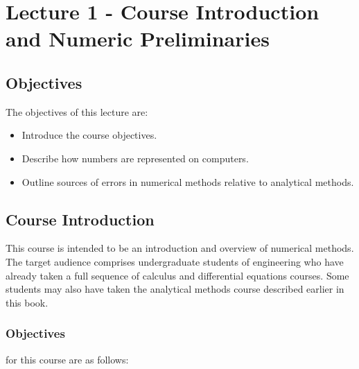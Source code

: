 \chapter{Lecture 1 - Course Introduction and Numeric Preliminaries}
\label{ch:lec1n}
\section{Objectives}
The objectives of this lecture are:
\begin{itemize}
\item Introduce the course objectives.
\item Describe how numbers are represented on computers.
\item Outline sources of errors in numerical methods relative to analytical methods.
\end{itemize}
\setcounter{lstannotation}{0}

\section{Course Introduction}

This course is intended to be an introduction and overview of numerical methods.  The target audience comprises undergraduate students of engineering who have already taken a full sequence of calculus and differential equations courses.  Some students may also have taken the analytical methods course described earlier in this book.  

\subsection{Objectives}
 for this course are as follows:

